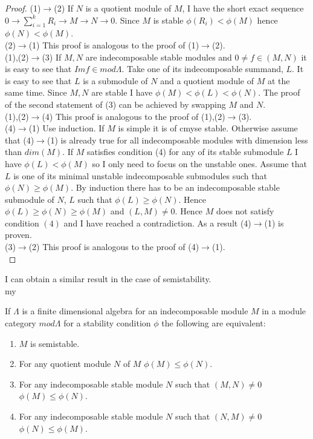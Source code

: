 \begin{proof}
\indent (1)$\to$(2) If $N$ is a quotient module of $M$, I have the short exact sequence $0\to\sum_{i=1}^kR_i\to M\to N\to 0$. Since $M$ is stable $\phi(R_i)<\phi(M)$ hence $\phi(N)<\phi(M)$.\\
\indent (2)$\to$(1) This proof is analogous to the proof of (1)$\to$(2).\\
\indent (1),(2)$\to$(3) If $M,N$ are indecomposable stable modules and $0\neq f\in(M,N)$ it is easy to see that $Im f\in mod\Lambda$. Take one of its indecomposable summand, $L$. It is easy to see that $L$ is a submodule of $N$ and a quotient module of $M$ at the same time. Since $M,N$ are stable I have $\phi(M)<\phi(L)<\phi(N)$. The proof of the second statement of (3) can be achieved by swapping $M$ and $N$.\\
\indent (1),(2)$\to$(4) This proof is analogous to the proof of (1),(2)$\to$(3).\\
\indent (4)$\to$(1) Use induction. If $M$ is simple it is of cmyse stable. Otherwise assume that (4)$\to$(1) is already true for all indecomposable modules with dimension less than $dim(M)$. If $M$ satisfies condition (4) for any of its stable submodule $L$ I have $\phi(L)<\phi(M)$ so I only need to focus on the unstable ones. Assume that $L$ is one of its minimal unstable indecomposable submodules such that $\phi(N)\geq\phi(M)$. By induction there has to be an indecomposable stable submodule of $N$, $L$ such that $\phi(L)\geq \phi(N)$. Hence $\phi(L)\geq\phi(N)\geq\phi(M)$ and $(L,M)\neq 0$. Hence $M$ does not satisfy condition $(4)$ and I have reached a contradiction. As a result (4)$\to$(1) is proven.\\
\indent (3)$\to$(2) This proof is analogous to the proof of (4)$\to$(1).\\
\end{proof}
\indent I can obtain a similar result in the case of semistability.\\my
\begin{theorem}
If $\Lambda$ is a finite dimensional algebra for an indecomposable module $M$ in a module category $mod \Lambda$ for a stability condition $\phi$ the following are equivalent:
\begin{enumerate}
\item $M$ is semistable.
\item For any quotient module $N$ of $M$ $\phi(M)\leq\phi(N)$.
\item For any indecomposable stable module $N$ such that $(M,N)\neq 0$ $\phi(M)\leq\phi(N)$.
\item For any indecomposable stable module $N$ such that $(N,M)\neq 0$ $\phi(N)\leq\phi(M)$.
\end{enumerate}
\end{theorem}
